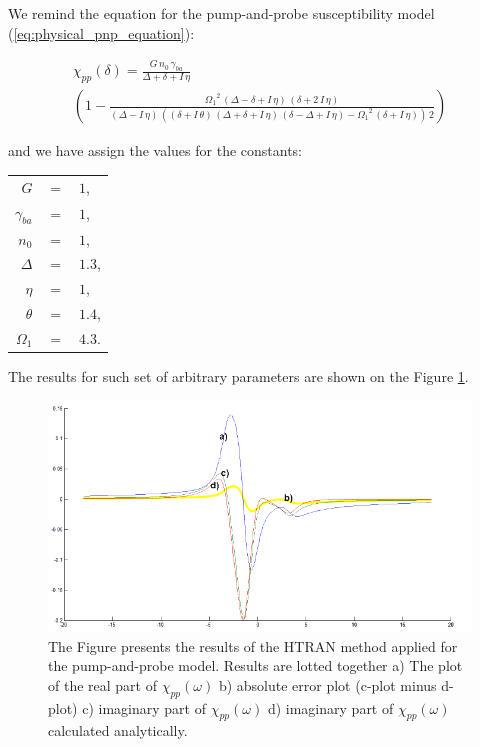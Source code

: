 \documentclass[12pt,twoside,a4paper]{article}
\numberwithin{equation}{subsection}
\numberwithin{figure}{subsection}
\begin{document}
We remind the equation for the pump-and-probe susceptibility model (\ref{eq:physical_pnp_equation}): 

\begin{multline} \label{eq:htran_fparameters}
  \chi_{pp} (\delta ) = \frac {G\,{n_{0}}\,{\gamma_{ba}}}{\Delta + \delta + I\,\eta } \\
    \left(  
    	1 - \frac{{\Omega_{1}}^{2}\,(\Delta - \delta  + I\,\eta )\,(\delta  + 2\,I\,\eta )}
    	         {(\Delta  - I\,\eta )\,((\delta + I\,\theta )\,(\Delta + \delta  + I\,\eta )\,(\delta - \Delta  + I\,\eta ) 
    	            - {\Omega_{1}}^{2}\,(\delta  + I\,\eta ))\,2} 
    \right) 
\end{multline}

and we have assign the values for the constants:
\begin{tabular}{r r l}
  $G$           & $=$ & $1$, \\
  $\gamma_{ba}$ & $=$ & $1$, \\
  $n_0$         & $=$ & $1$, \\
  $\Delta$      & $=$ & $1.3$, \\
  $\eta$        & $=$ & $1$, \\
  $\theta$      & $=$ & $1.4$, \\
  $\Omega_{1}$  & $=$ & $4.3$. \\
\end{tabular}

The results for such set of arbitrary parameters are shown on the Figure \ref{fig:htran_pnp_2d}.

\begin{figure}
  \includegraphics[width=150mm]{img/htran_pnp_2d.png}
  \caption{The Figure presents the results of the HTRAN method applied for the pump-and-probe model. Results are lotted together
    a) The plot of the real part of $\chi_{pp} (\omega )$ 
    b) absolute error plot (c-plot minus d-plot) 
    c) imaginary part of $\chi_{pp} (\omega )$
    d) imaginary part of ${\chi_{pp}}(\omega )$ calculated analytically.
    \label{fig:htran_pnp_2d}}
\end{figure}
\end{document}
